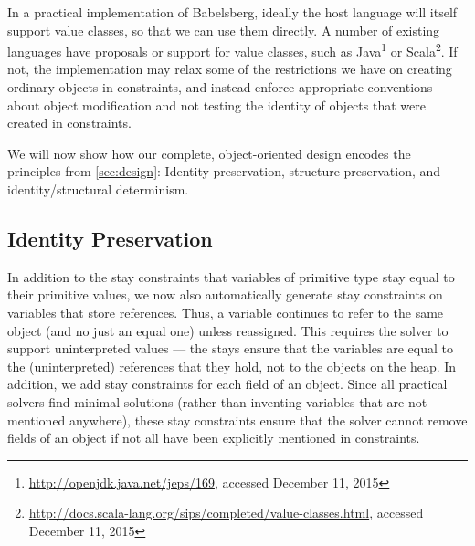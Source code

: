 In a practical implementation of Babelsberg, ideally the host language
will itself support value classes, so that we can use them directly. A
number of existing languages have proposals or support for value
classes, such as Java\footnote{\url{http://openjdk.java.net/jeps/169}, accessed December 11, 2015}
or
Scala\footnote{\url{http://docs.scala-lang.org/sips/completed/value-classes.html}, accessed December 11, 2015}.
If not, the implementation may relax some of the restrictions we have
on creating ordinary objects in constraints, and instead enforce
appropriate conventions about object modification and not testing the
identity of objects that were created in constraints.

We will now show how our complete, object-oriented design encodes the
principles from \autoref{sec:design}: Identity preservation, structure
preservation, and identity/structural determinism.

\subsection{Identity Preservation}
\label{sec:identity-preservation}
In addition to the stay constraints that variables of primitive type
stay equal to their primitive values, we now also automatically
generate stay constraints on variables that store references. Thus, a
variable continues to refer to the same object (and no just an equal
one) unless reassigned. This requires the solver to support
uninterpreted values --- the stays ensure that the variables are equal
to the (uninterpreted) references that they hold, not to the objects
on the heap. In addition, we add stay constraints for each field of an
object. Since all practical solvers find minimal solutions (rather
than inventing variables that are not mentioned anywhere), these stay
constraints ensure that the solver cannot remove fields of an object
if not all have been explicitly mentioned in constraints.

